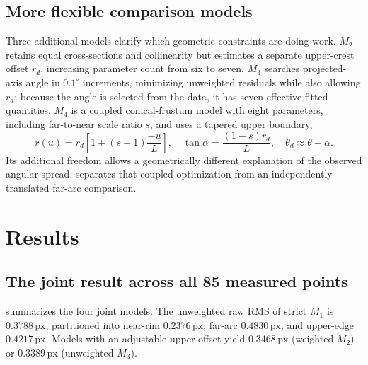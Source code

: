 \documentclass[11pt,letterpaper]{article}
\newcommand{\px}{\,\mathrm{px}}
\begin{document}
\subsection{More flexible comparison models}

Three additional models clarify which geometric constraints are doing work. \(M_2\) retains equal cross-sections and collinearity but estimates a separate upper-crest offset \(r_d\), increasing parameter count from six to seven. \(M_3\) searches projected-axis angle in \(0.1^\circ\) increments, minimizing unweighted residuals while also allowing \(r_d\); because the angle is selected from the data, it has seven effective fitted quantities. \(M_4\) is a coupled conical-frustum model with eight parameters, including far-to-near scale ratio \(s\), and uses a tapered upper boundary,
\begin{equation}
 r(u)=r_d\left[1+(s-1)\frac{-u}{L}\right],\quad
 \tan\alpha=\frac{(1-s)r_d}{L},\quad
 \theta_d\approx\theta-\alpha.
 \label{eq:taper}
\end{equation}
Its additional freedom allows a geometrically different explanation of the observed angular spread.  separates that coupled optimization from an independently translated far-arc comparison.

\section{Results}
\label{sec:results}

\subsection{The joint result across all 85 measured points}

 summarizes the four joint models. The unweighted raw RMS of strict \(M_1\) is \(0.3788\px\), partitioned into near-rim \(0.2376\px\), far-arc \(0.4830\px\), and upper-edge \(0.4217\px\). Models with an adjustable upper offset yield \(0.3468\px\) (weighted \(M_2\)) or \(0.3389\px\) (unweighted \(M_3\)).
\end{document}
